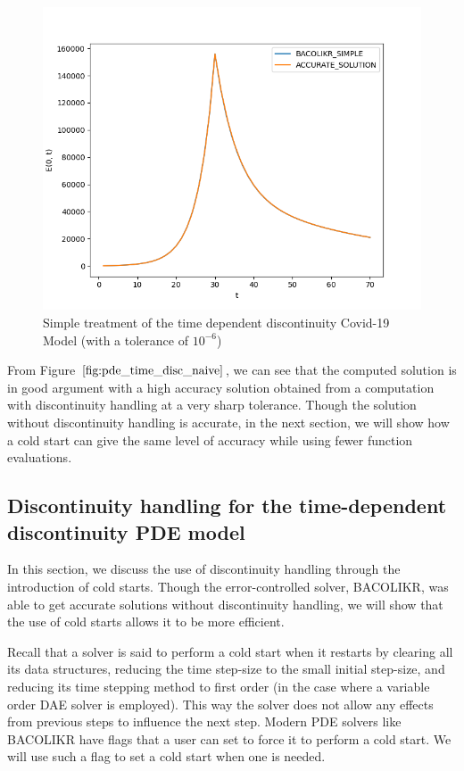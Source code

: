 \begin{figure}[H]
\centering
\includegraphics[width=0.7\linewidth]{./figures/pde_time_disc_naive}
\caption{Simple treatment of the time dependent discontinuity Covid-19 Model (with a tolerance of $10^{-6}$)}
\label{fig:pde_time_disc_naive}
\end{figure}

From Figure $\ref{fig:pde_time_disc_naive}$, we can see that the computed solution is in good argument with a high accuracy solution obtained from a computation with discontinuity handling at a very sharp tolerance. Though the solution without discontinuity handling is accurate, in the next section, we will show how a cold start can give the same level of accuracy while using fewer function evaluations.

\subsection{Discontinuity handling for the time-dependent discontinuity PDE model}
\label{subsubsection:pde_time_disc_hand}
In this section, we discuss the use of discontinuity handling through the introduction of cold starts. Though the error-controlled solver, BACOLIKR, was able to get accurate solutions without discontinuity handling, we will show that the use of cold starts allows it to be more efficient.

Recall that a solver is said to perform a cold start when it restarts by clearing all its data structures, reducing the time step-size to the small initial step-size, and reducing its time stepping method to first order (in the case where a variable order DAE solver is employed). This way the solver does not allow any effects from previous steps to influence the next step. Modern PDE solvers like BACOLIKR have flags that a user can set to force it to perform a cold start. We will use such a flag to set a cold start when one is needed.

